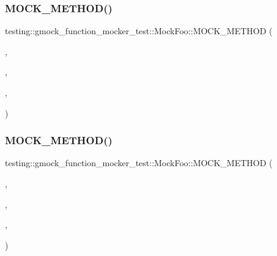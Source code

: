 \mbox{\label{classtesting_1_1gmock__function__mocker__test_1_1_mock_foo_a57a7faaeec9d76031292fa532c35c0c6}} 
\subsubsection{\texorpdfstring{MOCK\_METHOD()}{MOCK\_METHOD()}\hspace{0.1cm}{\footnotesize\ttfamily [30/38]}}
{\footnotesize\ttfamily testing\+::gmock\+\_\+function\+\_\+mocker\+\_\+test\+::\+Mock\+Foo\+::\+M\+O\+C\+K\+\_\+\+M\+E\+T\+H\+OD (\begin{DoxyParamCaption}\item[{int}]{,  }\item[{\mbox{\hyperlink{classtesting_1_1gmock__function__mocker__test_1_1_foo_interface_a94e43dbddc176d1702a7a7d7281f2642}{Overloaded\+On\+Constness}}}]{,  }\item[{()}]{,  }\item[{(override)}]{ }\end{DoxyParamCaption})}

\mbox{\label{classtesting_1_1gmock__function__mocker__test_1_1_mock_foo_a83b1f88fdda3669b8c600daee345bbbc}} 
\subsubsection{\texorpdfstring{MOCK\_METHOD()}{MOCK\_METHOD()}\hspace{0.1cm}{\footnotesize\ttfamily [31/38]}}
{\footnotesize\ttfamily testing\+::gmock\+\_\+function\+\_\+mocker\+\_\+test\+::\+Mock\+Foo\+::\+M\+O\+C\+K\+\_\+\+M\+E\+T\+H\+OD (\begin{DoxyParamCaption}\item[{char}]{,  }\item[{\mbox{\hyperlink{classtesting_1_1gmock__function__mocker__test_1_1_foo_interface_a94e43dbddc176d1702a7a7d7281f2642}{Overloaded\+On\+Constness}}}]{,  }\item[{()}]{,  }\item[{(override, const)}]{ }\end{DoxyParamCaption})}

